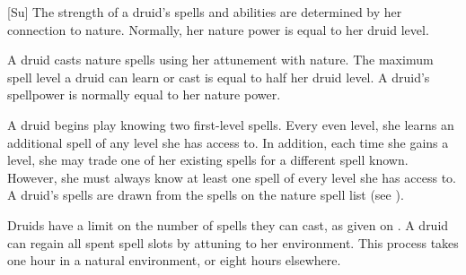 [Su]
The strength of a druid's spells and abilities are determined by her connection to nature.
Normally, her nature power is equal to her druid level.

A druid casts nature spells using her attunement with nature.
The maximum spell level a druid can learn or cast is equal to half her druid level.
A druid's spellpower is normally equal to her nature power.

A druid begins play knowing two first-level spells.
Every even level, she learns an additional spell of any level she has access to.
In addition, each time she gains a level, she may trade one of her existing spells for a different spell known.
However, she must always know at least one spell of every level she has access to.
A druid's spells are drawn from the spells on the nature spell list (see ).

Druids have a limit on the number of spells they can cast, as given on .
A druid can regain all spent spell slots by attuning to her environment.
This process takes one hour in a natural environment, or eight hours elsewhere.


